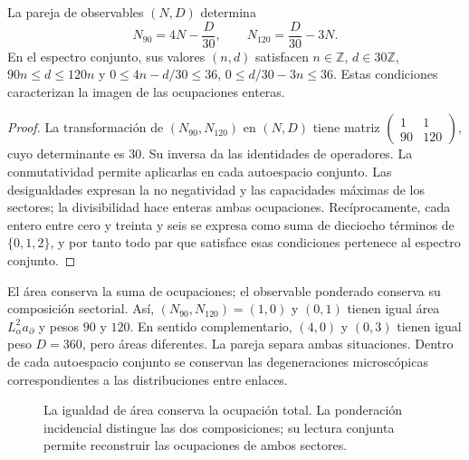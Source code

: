 \begin{theorem}
\label{rev4:ae:recuperacion}
La pareja de observables \((N,D)\) determina
\begin{equation}
 N_{90}=4N-\frac{D}{30},
 \qquad N_{120}=\frac{D}{30}-3N.
 \label{rev4:ae:inversa}
\end{equation}
En el espectro conjunto, sus valores \((n,d)\) satisfacen
\(n\in\mathbb Z\), \(d\in30\mathbb Z\), \(90n\le d\le120n\) y
\(0\le4n-d/30\le36\), \(0\le d/30-3n\le36\).
Estas condiciones caracterizan la imagen de las ocupaciones enteras.
\end{theorem}
\begin{proof}
La transformación de \((N_{90},N_{120})\) en \((N,D)\) tiene matriz
\(\left(\begin{smallmatrix}1&1\\90&120\end{smallmatrix}\right)\),
cuyo determinante es \(30\). Su inversa da las identidades de
operadores. La conmutatividad permite aplicarlas en cada autoespacio
conjunto. Las desigualdades expresan la no negatividad y las capacidades
máximas de los sectores; la divisibilidad hace enteras ambas ocupaciones.
Recíprocamente, cada entero entre cero y treinta y seis se expresa como
suma de dieciocho términos de \(\{0,1,2\}\), y por tanto todo par
que satisface esas condiciones pertenece al espectro conjunto.
\end{proof}

El área conserva la suma de ocupaciones; el observable ponderado conserva
su composición sectorial. Así, \((N_{90},N_{120})=(1,0)\) y \((0,1)\)
tienen igual área \(L_\alpha^2a_\partial\) y pesos \(90\) y \(120\).
En sentido complementario, \((4,0)\) y \((0,3)\) tienen igual peso
\(D=360\), pero áreas diferentes. La pareja separa ambas situaciones.
Dentro de cada autoespacio conjunto se conservan las degeneraciones
microscópicas correspondientes a las distribuciones entre enlaces.

\begin{figure}[htbp]
\centering
{}
\caption{La igualdad de área conserva la ocupación total. La ponderación
incidencial distingue las dos composiciones; su lectura conjunta permite
reconstruir las ocupaciones de ambos sectores.}
\label{rev4:ae:figura}
\end{figure}

